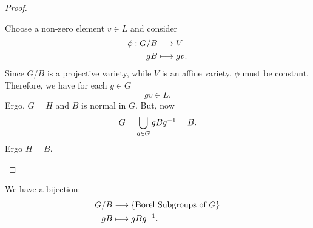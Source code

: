 \begin{proof}
\begin{itemize}
\begin{itemize}
			Choose a non-zero element $v \in L$ and consider
			\begin{align*}
			\phi : G/B& \overset{}{\longrightarrow} V\\
			gB &\longmapsto gv.
			\end{align*}
			Since $G/B$ is a projective variety, while $V$ is an affine variety, $\phi$ must be constant. Therefore, we have for each $g \in G$
			\[ gv \in L. \]
			Ergo, $ G = H$ and $B$ is normal in $G$. But, now
			\[ G = \bigcup_{g\in G} gBg^{-1} = B. \]
			Ergo $H = B$.\qedhere
		\end{itemize}
	\end{itemize}
\end{proof}
\begin{corollary}
We have a bijection:
	\begin{align*}
	G/B & \overset{}{\longrightarrow} \left\lbrace\text{Borel Subgroups of }G\right\rbrace\\
	gB & \longmapsto gBg^{-1}.
	\end{align*}
\end{corollary}